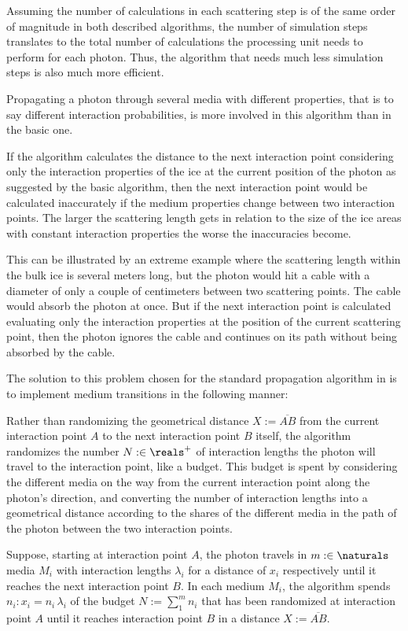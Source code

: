 Assuming the number of calculations in each scattering step is of the same order of magnitude in both described algorithms, the number of simulation steps translates to the total number of calculations the processing unit needs to perform for each photon. Thus, the algorithm that needs much less simulation steps is also much more efficient.

Propagating a photon through several media with different properties, that is to say different interaction probabilities, is more involved in this algorithm than in the basic one.

If the algorithm calculates the distance to the next interaction point considering only the interaction properties of the ice at the current position of the photon as suggested by the basic algorithm, then the next interaction point would be calculated inaccurately if the medium properties change between two interaction points. The larger the scattering length gets in relation to the size of the ice areas with constant interaction properties the worse the inaccuracies become.

This can be illustrated by an extreme example where the scattering length within the bulk ice is several meters long, but the photon would hit a cable with a diameter of only a couple of centimeters between two scattering points. The cable would absorb the photon at once. But if the next interaction point is calculated evaluating only the interaction properties at the position of the current scattering point, then the photon ignores the cable and continues on its path without being absorbed by the cable.

The solution to this problem chosen for the standard propagation algorithm in \icecube is to implement medium transitions in the following manner:

Rather than randomizing the geometrical distance $X:=\overline{AB}$ from the current interaction point $A$ to the next interaction point $B$ itself, the algorithm randomizes the number $N :\in \reals^+$ of interaction lengths the photon will travel to the interaction point, like a budget. This budget is spent by considering the different media on the way from the current interaction point along the photon's direction, and converting the number of interaction lengths into a geometrical distance according to the shares of the different media in the path of the photon between the two interaction points.

Suppose, starting at interaction point $A$, the photon travels in $m :\in \naturals$ media $M_i$ with interaction lengths $\lambda_i$ for a distance of $x_i$ respectively until it reaches the next interaction point $B$. In each medium $M_i$, the algorithm spends $n_i: x_i = n_i\,\lambda_i$ of the budget $N:=\sum_1^m n_i$ that has been randomized at interaction point $A$ until it reaches interaction point $B$ in a distance $X:=\overline{AB}$.


